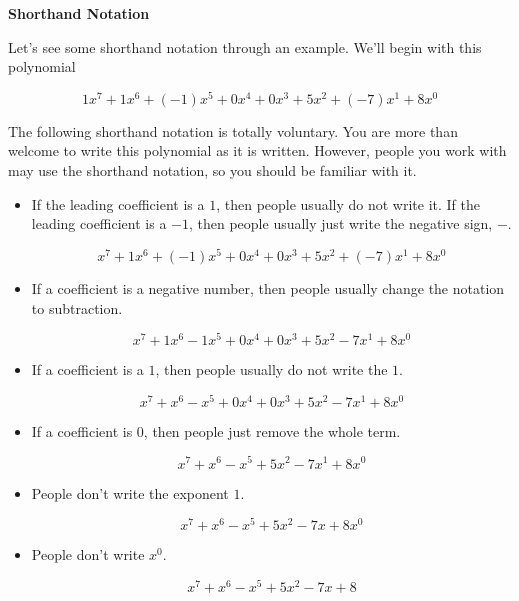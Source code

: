 \documentclass{ximera}
\begin{document}
\textbf{Shorthand Notation}


Let's see some shorthand notation through an example.  We'll begin with this polynomial


\[  1 x^7 + 1 x^6 + (-1) x^5 + 0 x^4 + 0 x^3 + 5 x^2 + (-7) x^1 + 8 x^0              \]



The following shorthand notation is totally voluntary.  You are more than welcome to write this polynomial as it is written. However, people you work with may use the shorthand notation, so you should be familiar with it.



\begin{itemize}
\item If the leading coefficient is a $1$, then people usually do not write it. If the leading coefficient is a $-1$, then people usually just write the negative sign, $-$.


\[  x^7 + 1 x^6 + (-1) x^5 + 0 x^4 + 0 x^3 + 5 x^2 + (-7) x^1 + 8 x^0              \]


\item If a coefficient is a negative number, then people usually change the notation to subtraction.


\[  x^7 + 1 x^6 - 1 x^5 + 0 x^4 + 0 x^3 + 5 x^2 - 7 x^1 + 8 x^0              \]



\item If a coefficient is a $1$, then people usually do not write the $1$.


\[  x^7 + x^6 - x^5 + 0 x^4 + 0 x^3 + 5 x^2 - 7 x^1 + 8 x^0              \]


\item If a coefficient is $0$, then people just remove the whole term.

\[  x^7 + x^6 - x^5 + 5 x^2 - 7 x^1 + 8 x^0              \]


\item People don't write the exponent $1$.

\[  x^7 + x^6 - x^5 + 5 x^2 - 7 x + 8 x^0              \]



\item People don't write $x^0$.

\[  x^7 + x^6 - x^5 + 5 x^2 - 7 x + 8             \]




\end{itemize}
\end{document}
